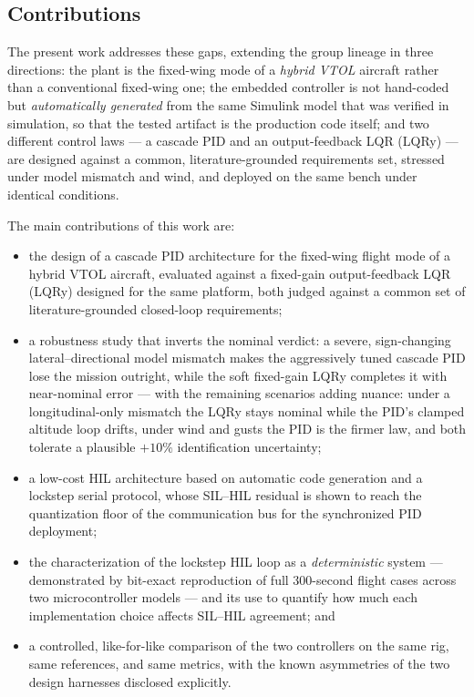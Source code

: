 \subsection{Contributions}
The present work addresses these gaps, extending the group lineage in
three directions: the plant
is the fixed-wing mode of a \emph{hybrid VTOL} aircraft rather than a
conventional fixed-wing one; the embedded controller is not hand-coded
but \emph{automatically generated} from the same Simulink model that
was verified in simulation, so that the tested artifact is the
production code itself; and two different control laws --- a cascade
PID and an output-feedback LQR (LQRy) --- are designed against a
common, literature-grounded requirements set, stressed under model
mismatch and wind, and deployed on the same bench under identical
conditions.

The main contributions of this work are:
\begin{itemize}
  \item the design of a cascade PID architecture for the fixed-wing
        flight mode of a hybrid VTOL aircraft, evaluated against a
        fixed-gain output-feedback LQR (LQRy) designed for the same
        platform, both judged against a common set of
        literature-grounded closed-loop requirements;
  \item a robustness study that inverts the nominal verdict: a
        severe, sign-changing lateral--directional model mismatch
        makes the aggressively tuned cascade PID lose the mission
        outright, while the soft fixed-gain LQRy completes it with
        near-nominal error --- with the remaining scenarios adding
        nuance: under a longitudinal-only mismatch the LQRy stays
        nominal while the PID's clamped altitude loop drifts, under
        wind and gusts the PID is the firmer law, and both tolerate a
        plausible $+10\%$ identification uncertainty;
  \item a low-cost HIL architecture based on
        automatic code generation and a lockstep serial protocol, whose
        SIL--HIL residual is shown to reach the quantization floor of
        the communication bus for the synchronized PID deployment;
  \item the characterization of the lockstep HIL loop as a
        \emph{deterministic} system --- demonstrated by bit-exact
        reproduction of full 300-second flight cases across two
        microcontroller models --- and its use to quantify how much each
        implementation choice affects SIL--HIL agreement; and
  \item a controlled, like-for-like comparison of the two controllers on
        the same rig, same references, and same metrics, with the known
        asymmetries of the two design harnesses disclosed explicitly.
\end{itemize}

